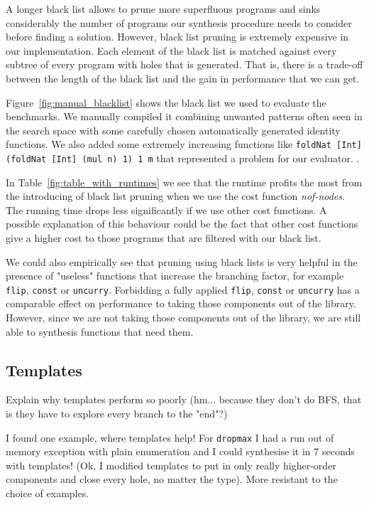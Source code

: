 A longer black list allows to prune more superfluous programs and sinks considerably the number of programs our synthesis procedure needs to consider before finding a solution. However, black list pruning is extremely expensive in our implementation. Each element of the black list is matched against every subtree of every program with holes that is generated. That is, there is a trade-off between the length of the black list and the gain in performance that we can get.

Figure~\ref{fig:manual_blacklist} shows the black list  we used to evaluate the benchmarks. We manually compiled it combining unwanted patterns often seen in the search space with some carefully chosen automatically generated identity functions. We also added some extremely increasing functions like \lstinline!foldNat [Int] (foldNat [Int] (mul n) 1) 1 m! that represented a problem for our evaluator.
.

In Table~\ref{fig:table_with_runtimes} we see that the runtime profits the most from the introducing of black list pruning when we use the cost function \textit{nof-nodes}.
The running time drops less significantly if we use other cost functions. A possible explanation of this behaviour could be the fact that other cost functions give a higher cost to those programs that are filtered with our black list.

We could also empirically see that pruning using black lists is very helpful in the presence of "useless" functions that increase the branching factor, for example \lstinline?flip?, \lstinline?const? or \lstinline?uncurry?. Forbidding a fully applied \lstinline?flip?, \lstinline?const? or \lstinline?uncurry? has a comparable effect on performance to taking those components out of the library. However, since we are not taking those components out of the library, we are still able to synthesis functions that need them.

\subsection{Templates}
Explain why templates perform so poorly (hm... because they don't do BFS, that is they have to explore every branch to the "end"?)

I found one example, where templates help! For \lstinline?dropmax? I had a run out of memory exception with plain enumeration and I could synthesise it in 7 seconds with templates!
(Ok, I modified templates to put in only really higher-order components and close every hole, no matter the type). More resistant to the choice of examples.

